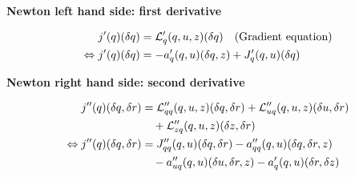 \textbf{Newton left hand side: first derivative}

\begin{align*}
j'(q)(\delta q) &= {\cal L}_{q}' (q,u,z)(\delta q) \quad\text{(Gradient equation)} \\
\Leftrightarrow j'(q)(\delta q) &= -a_q' (q,u)(\delta q,z) + J_{q}'(q,u)(\delta q)
\end{align*}

\textbf{Newton right hand side: second derivative}

\begin{align*}
j''(q)(\delta q, \delta r) &= {\cal L}_{qq}'' (q,u,z)(\delta q, \delta r) + 
{\cal L}_{uq}'' (q,u,z)(\delta u, \delta r) \\
&\quad +  {\cal L}_{zq}'' (q,u,z)(\delta z, \delta r) \\
\Leftrightarrow  j''(q)(\delta q, \delta r) &= 
J_{qq}''(q,u)(\delta q, \delta r) -a_{qq}'' (q,u)(\delta q,\delta r, z) \\
&\quad - a_{uq}'' (q,u)(\delta u,\delta r, z) -a_{q}' (q,u)(\delta r,\delta z)  
\end{align*}

